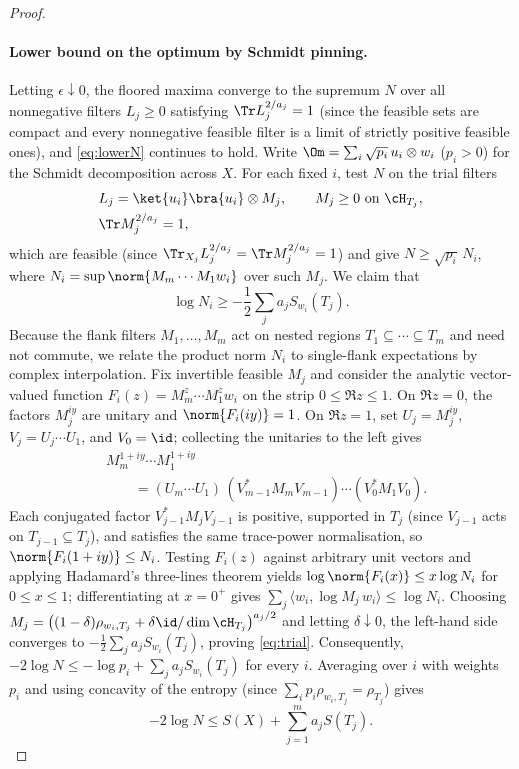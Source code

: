 \begin{proof}
\paragraph{Lower bound on the optimum by Schmidt pinning.}
Letting $\epsilon\downarrow0$, the floored maxima converge to the supremum
$N$ over all nonnegative filters $L_j\ge0$ satisfying $\Tr L_j^{2/a_j}=1$
(since the feasible sets are compact and every nonnegative feasible filter
is a limit of strictly positive feasible ones), and \eqref{eq:lowerN}
continues to hold. Write $\Om=\sum_i\sqrt{p_i}\,u_i\otimes w_i$ ($p_i>0$)
for the Schmidt decomposition across $X$. For each fixed $i$, test $N$ on
the trial filters
\[
\begin{split}
 &L_j=\ket{u_i}\bra{u_i}\otimes M_j,\qquad M_j\ge0\text{ on }\cH_{T_j},\\
 &\Tr M_j^{2/a_j}=1,
\end{split}
\]
which are feasible (since $\Tr_{X_j}L_j^{2/a_j}=\Tr M_j^{2/a_j}=1$) and give
$N\ge\sqrt{p_i}\,N_i$, where $N_i=\sup\norm{M_m\cdots M_1w_i}$ over such $M_j$.
We claim that
\begin{equation}\label{eq:trial}
 \log N_i\ge-\frac12\sum_ja_jS_{w_i}(T_j).
\end{equation}
Because the flank filters $M_1,\dots,M_m$ act on nested regions
$T_1\subseteq\cdots\subseteq T_m$ and need not commute, we relate the
product norm $N_i$ to single-flank expectations by complex interpolation.
Fix invertible feasible $M_j$ and consider the analytic vector-valued
function $F_i(z)=M_m^z\cdots M_1^zw_i$ on the strip $0\le\Re z\le1$. On
$\Re z=0$, the factors $M_j^{iy}$ are unitary and $\norm{F_i(iy)}=1$. On
$\Re z=1$, set $U_j=M_j^{iy}$, $V_j=U_j\cdots U_1$, and $V_0=\id$;
collecting the unitaries to the left gives
\[
\begin{split}
 &M_m^{1+iy}\cdots M_1^{1+iy}\\
 &\qquad=(U_m\cdots U_1)\,(V_{m-1}^*M_mV_{m-1})\cdots(V_0^*M_1V_0).
\end{split}
\]
Each conjugated factor $V_{j-1}^*M_jV_{j-1}$ is positive, supported in
$T_j$ (since $V_{j-1}$ acts on $T_{j-1}\subseteq T_j$), and satisfies the
same trace-power normalisation, so $\norm{F_i(1+iy)}\le N_i$. Testing
$F_i(z)$ against arbitrary unit vectors and applying Hadamard's
three-lines theorem yields $\log\norm{F_i(x)}\le x\log N_i$ for
$0\le x\le1$; differentiating at $x=0^+$ gives
$\sum_j\langle w_i,\log M_j\,w_i\rangle\le\log N_i$. Choosing
$M_j=\bigl((1-\delta)\rho_{w_i,T_j}+\delta\id/\dim\cH_{T_j}\bigr)^{a_j/2}$ and
letting $\delta\downarrow0$, the left-hand side converges to
$-\frac12\sum_ja_jS_{w_i}(T_j)$, proving \eqref{eq:trial}. Consequently,
$-2\log N\le-\log p_i+\sum_ja_jS_{w_i}(T_j)$ for every $i$. Averaging over
$i$ with weights $p_i$ and using concavity of the entropy (since
$\sum_ip_i\rho_{w_i,T_j}=\rho_{T_j}$) gives
\begin{equation}\label{eq:upperN}
 -2\log N\le S(X)+\sum_{j=1}^ma_jS(T_j).
\end{equation}


\end{proof}
